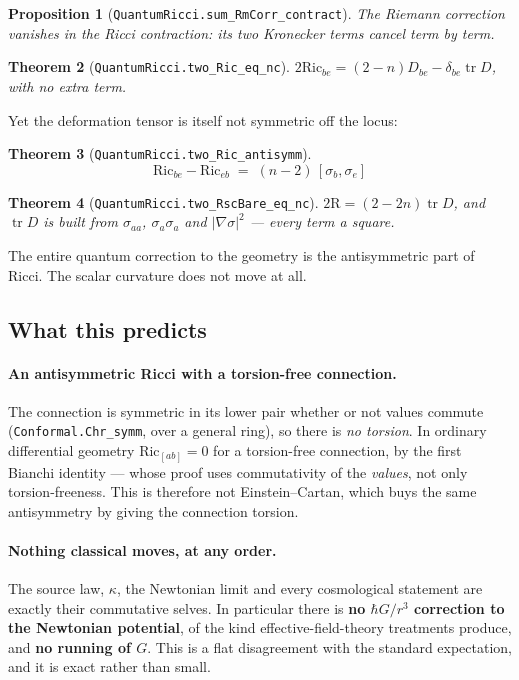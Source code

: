 \documentclass[11pt,a4paper]{article}
\newtheorem{theorem}{Theorem}[section]
\newtheorem{proposition}[theorem]{Proposition}
\theoremstyle{definition}
\theoremstyle{remark}
\newcommand{\lean}[1]{\texttt{\small #1}}
\newcommand{\Ric}{\mathrm{Ric}}
\newcommand{\Rsc}{\mathrm{R}}
\newcommand{\Defm}{D}
\newcommand{\sg}{\sigma}
\begin{document}
\begin{proposition}[\lean{QuantumRicci.sum\_RmCorr\_contract}]
The Riemann correction vanishes in the Ricci contraction: its two Kronecker terms
cancel term by term.
\end{proposition}

\begin{theorem}[\lean{QuantumRicci.two\_Ric\_eq\_nc}]
$2\Ric_{be}=(2-n)\Defm_{be}-\delta_{be}\operatorname{tr}\Defm$, with no extra term.
\end{theorem}

Yet the deformation tensor is itself not symmetric off the locus:

\begin{theorem}[\lean{QuantumRicci.two\_Ric\_antisymm}]
\[
  \boxed{\ \Ric_{be}-\Ric_{eb}\;=\;(n-2)\,[\sg_b,\sg_e]\ }
\]
\end{theorem}

\begin{theorem}[\lean{QuantumRicci.two\_RscBare\_eq\_nc}]
$2\Rsc=(2-2n)\operatorname{tr}\Defm$, and $\operatorname{tr}\Defm$ is built from
$\sg_{aa}$, $\sg_a\sg_a$ and $|\nabla\sg|^{2}$ --- every term a square.
\end{theorem}

\begin{claimbox}
The entire quantum correction to the geometry is the antisymmetric part of Ricci.
The scalar curvature does not move at all.
\end{claimbox}

\subsection{What this predicts}

\paragraph{An antisymmetric Ricci with a torsion-free connection.}
The connection is symmetric in its lower pair whether or not values commute
(\lean{Conformal.Chr\_symm}, over a general ring), so there is \emph{no torsion}.
In ordinary differential geometry $\Ric_{[ab]}=0$ for a torsion-free connection, by
the first Bianchi identity --- whose proof uses commutativity of the \emph{values},
not only torsion-freeness. This is therefore not Einstein--Cartan, which buys the
same antisymmetry by giving the connection torsion.

\paragraph{Nothing classical moves, at any order.}
The source law, $\kappa$, the Newtonian limit and every cosmological statement are
exactly their commutative selves. In particular there is \textbf{no $\hbar G/r^{3}$
correction to the Newtonian potential}, of the kind effective-field-theory
treatments produce, and \textbf{no running of $G$}. This is a flat disagreement
with the standard expectation, and it is exact rather than small.
\end{document}
